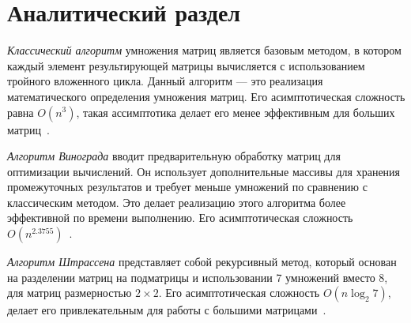 \chapter{Аналитический раздел}

\textit{Классический алгоритм} умножения матриц является базовым методом, в котором каждый элемент результирующей матрицы вычисляется с использованием тройного вложенного цикла. 
Данный алгоритм --- это реализация математического определения умножения матриц.
Его асимптотическая сложность равна $O(n^3)$, такая ассимптотика делает его менее эффективным для больших матриц~\cite{matrix}.

\textit{Алгоритм Винограда} вводит предварительную обработку матриц для оптимизации вычислений. Он использует дополнительные массивы для хранения промежуточных результатов и требует меньше умножений по сравнению с классическим методом. 
Это делает реализацию этого алгоритма более эффективной по времени выполнению. 
Его асимптотическая сложность $O(n^{2.3755})$~\cite{vino}.

\textit{Алгоритм Штрассена} представляет собой рекурсивный метод, который основан на разделении матриц на подматрицы и использовании 7 умножений вместо 8, для матриц размерностью $2\times2$. Его асимптотическая сложность $O(n \log_2 7)$, делает его привлекательным для работы с большими матрицами~\cite{shtrassen}. 
